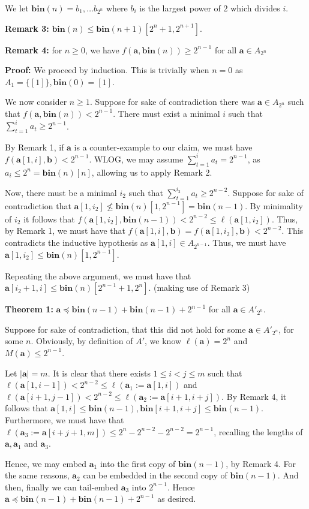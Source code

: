 \documentclass{article}
\begin{document}
We let $\textbf{bin}(n) = b_1,\dots b_{2^n}$ where $b_i$ is the largest power of $2$ which divides $i$.



\textbf{Remark 3:} $\textbf{bin}(n)\le \textbf{bin}(n+1)[2^n+1,2^{n+1}]$.



\textbf{Remark 4:} for $n \ge 0$, we have $f(\textbf{a},\textbf{bin}(n))\ge 2^{n-1} $ for all $\textbf{a} \in A_{2^{n}}$

\textbf{Proof:} We proceed by induction. This is trivially  when $n = 0$ as $A_1 = \{[1]\},\textbf{bin}(0) = [1]$.

We now consider $n \ge 1$. Suppose for sake of contradiction there was $\textbf{a} \in A_{2^n}$ such that $f(\textbf{a},\textbf{bin}(n))<2^{n-1}$. There must exist a minimal $i$ such that $\sum_{t=1}^{i} a_t \ge 2^{n-1}$. 

By Remark 1, if $\textbf{a}$ is a counter-example to our claim, we must have $f(\textbf{a}[1,i],\textbf{b})<2^{n-1}$. WLOG, we may assume $\sum_{t=1}^i a_t = 2^{n-1}$, as $a_i \le 2^n = \textbf{bin}(n)[n]$, allowing us to apply Remark 2.

Now, there must be a minimal $i_2$ such that $\sum_{t=1}^{i_2} a_t \ge 2^{n-2}$. Suppose for sake of contradiction that $\textbf{a}[1,i_2] \not\le \textbf{bin}(n)[1,2^{n-1}] = \textbf{bin}(n-1)$. By minimality of $i_2$ it follows that $f(\textbf{a}[1,i_2],\textbf{bin}(n-1)) < 2^{n-2}\le \ell(\textbf{a}[1,i_2])$. Thus, by Remark 1, we must have that $f(\textbf{a}[1,i],\textbf{b}) = f(\textbf{a}[1,i_2],\textbf{b})<2^{n-2}$. This contradicts the inductive hypothesis as $\textbf{a}[1,i] \in A_{2^{n-1}}$. Thus, we must have $\textbf{a}[1,i_2]\le \textbf{bin}(n)[1,2^{n-1}]$.

Repeating the above argument, we must have that $\textbf{a}[i_2+1,i] \le \textbf{bin}(n)[2^{n-1}+1,2^n]$. (making use of Remark 3)

\textbf{Theorem 1:} $\textbf{a} \preceq \textbf{bin}(n-1)+\textbf{bin}(n-1)+2^{n-1}$ for all $\textbf{a} \in A'_{2^n}$.

Suppose for sake of contradiction, that this did not hold for some $\textbf{a} \in A'_{2^n}$, for some $n$. Obviously, by definition of $A'$, we know $\ell(\textbf{a}) = 2^n$ and $M(\textbf{a}) \le 2^{n-1}$. 

Let $|\textbf{a}| = m$. It is clear that there exists $1\le i<j \le m$ such that $\ell(\textbf{a}[1,i-1])<2^{n-2}\le \ell(\textbf{a}_1:=\textbf{a}[1,i])$ and $\ell(\textbf{a}[i+1,j-1])<2^{n-2}\le \ell(\textbf{a}_2:=\textbf{a}[i+1,i+j])$. By Remark 4, it follows that $\textbf{a}[1,i] \le \textbf{bin}(n-1),\textbf{bin}[i+1,i+j] \le \textbf{bin}(n-1)$. Furthermore, we must have that $\ell(\textbf{a}_3:=\textbf{a}[i+j+1,m]) \le 2^n-2^{n-2}-2^{n-2} = 2^{n-1}$, recalling the lengths of $\textbf{a},\textbf{a}_1$ and $\textbf{a}_3$. 

Hence, we may embed $\textbf{a}_1$ into the first copy of $\textbf{bin}(n-1)$, by Remark 4. For the same reasons, $\textbf{a}_2$ can be embedded in the second copy of $\textbf{bin}(n-1)$. And then, finally we can tail-embed $\textbf{a}_3$ into $2^{n-1}$. Hence $\textbf{a} \preceq \textbf{bin}(n-1)+\textbf{bin}(n-1)+2^{n-1}$ as desired.
\end{document}
